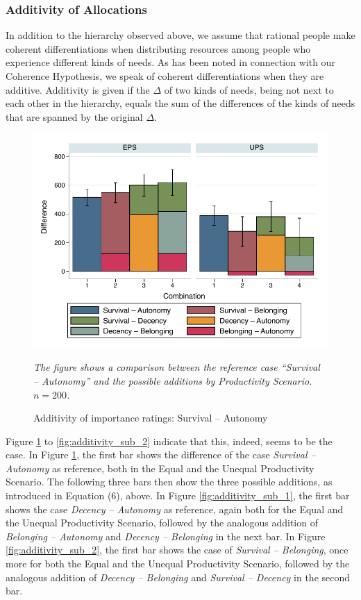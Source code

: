 \documentclass[egregdoesnotlikesansseriftitles]{scrartcl}
\begin{document}
\subsubsection{Additivity of Allocations}\label{sec:results_additivity}
In addition to the hierarchy observed above, we assume that rational people make coherent differentiations when distributing resources among people who experience different kinds of needs.
As has been noted in connection with our Coherence Hypothesis, we speak of coherent differentiations when they are additive.
Additivity is given if the $\Delta$ of two kinds of needs, being not next to each other in the hierarchy, equals the sum of the differences of the kinds of needs that are spanned by the original $\Delta$.

\begin{figure}[t]
   \centering
   \includegraphics[width=.75\textwidth]{figures/figure_6.pdf}
   \begin{minipage}{0.75\linewidth}
   \footnotesize
   \emph{The figure shows a comparison between the reference case ``Survival -- Autonomy'' and the possible additions by Productivity Scenario. $n = 200$.}
   \end{minipage}	
   \caption{Additivity of importance ratings: Survival -- Autonomy}
   \label{fig:additivity_all}
\end{figure}

Figure \ref{fig:additivity_all} to \ref{fig:additivity_sub_2} indicate that this, indeed, seems to be the case.
In Figure \ref{fig:additivity_all}, the first bar shows the difference of the case \textit{Survival -- Autonomy} as reference, both in the Equal and the Unequal Productivity Scenario.
The following three bars then show the three possible additions, as introduced in Equation (6), above.
In Figure \ref{fig:additivity_sub_1}, the first bar shows the case \textit{Decency -- Autonomy} as reference, again both for the Equal and the Unequal Productivity Scenario, followed by the analogous addition of \textit{Belonging -- Autonomy} and \textit{Decency -- Belonging} in the next bar.
In Figure \ref{fig:additivity_sub_2}, the first bar shows the case of \textit{Survival -- Belonging}, once more for both the Equal and the Unequal Productivity Scenario, followed by the analogous addition of \textit{Decency -- Belonging} and \textit{Survival -- Decency} in the second bar.
\end{document}
